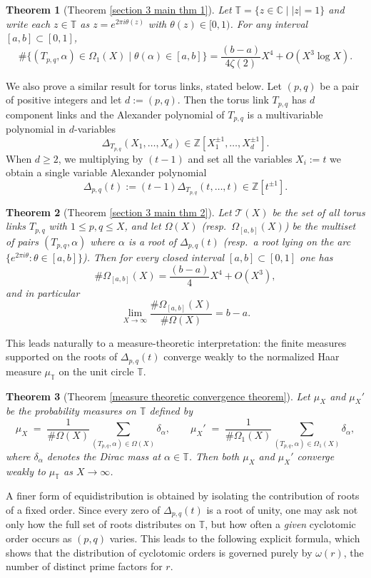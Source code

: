 \documentclass[table]{amsart}
\newtheorem{lthm}{Theorem}
\newcommand{\Z}{\mathbb{Z}}
\numberwithin{equation}{section}
\begin{document}
\begin{lthm}[Theorem \ref{section 3 main thm 1}]
Let $\mathbb{T}=\{z\in\mathbb{C}\mid |z|=1\}$ and write each $z\in\mathbb{T}$ as $z=e^{2\pi i\theta(z)}$ with $\theta(z)\in[0,1)$. For any interval $[a,b]\subset[0,1]$,
\[
\#\{(T_{p,q},\alpha)\in\Omega_1(X)\mid \theta(\alpha)\in[a,b]\}
= \frac{(b-a)}{4\zeta(2)}X^4 + O(X^3\log X).
\]
\end{lthm}
\noindent We also prove a similar result for torus links, stated below. Let $(p,q)$ be a pair of positive integers and let $d:=(p,q)$. Then the torus link $T_{p,q}$ has $d$ component links and the Alexander polynomial of $T_{p,q}$ is a multivariable polynomial in $d$-variables 
\[\Delta_{T_{p,q}}(X_1,\dots, X_d)\in \Z[X_1^{\pm 1}, \dots, X_d^{\pm 1}].\] When $d\geq 2$, we multiplying by $(t-1)$ and set all the variables $X_i:=t$ we obtain a single variable Alexander polynomial
\[\Delta_{p,q}(t):=(t-1)\Delta_{T_{p,q}}(t, \dots, t)\in \Z[t^{\pm 1}].\]
\begin{lthm}[Theorem \ref{section 3 main thm 2}]
Let $\mathcal{T}(X)$ be the set of all torus links $T_{p,q}$ with $1\le p,q\le X$, and let $\Omega(X)$ (resp.\ $\Omega_{[a,b]}(X)$) be the multiset of pairs $(T_{p,q},\alpha)$ where $\alpha$ is a root of $\Delta_{p,q}(t)$ (resp.\ a root lying on the arc $\{e^{2\pi i\theta}:\theta\in[a,b]\}$). Then for every closed interval $[a,b]\subset[0,1]$ one has
\[
\#\Omega_{[a,b]}(X)=\frac{(b-a)}{4}X^{4}+O(X^{3}),
\]
and in particular
\[
\lim_{X\to\infty}\frac{\#\Omega_{[a,b]}(X)}{\#\Omega(X)} = b-a.
\]
\end{lthm}





This leads naturally to a measure-theoretic interpretation: the finite measures supported on the roots of 
$\Delta_{p,q}(t)$ converge weakly to the normalized Haar measure $\mu_{\mathbb{T}}$ on the unit circle $\mathbb{T}$. 

\begin{lthm}[Theorem \ref{measure theoretic convergence theorem}]
Let $\mu_X$ and $\mu_X'$ be the probability measures on $\mathbb{T}$ defined by
\[
\mu_X \;=\; \frac{1}{\#\Omega(X)} \sum_{(T_{p,q},\alpha)\in\Omega(X)} \delta_{\alpha},
\qquad
\mu_X' \;=\; \frac{1}{\#\Omega_1(X)} \sum_{(T_{p,q},\alpha)\in\Omega_1(X)} \delta_{\alpha},
\]
where $\delta_{\alpha}$ denotes the Dirac mass at $\alpha\in\mathbb{T}$. Then both $\mu_X$ and $\mu_X'$ converge \emph{weakly} to $\mu_{\mathbb{T}}$ as $X\to\infty$.
\end{lthm}
A finer form of equidistribution is obtained by isolating the contribution of roots of a fixed order.  
Since every zero of $\Delta_{p,q}(t)$ is a root of unity, one may ask not only how the full set of roots distributes on $\mathbb{T}$, but how often a \emph{given} cyclotomic order occurs as $(p,q)$ varies. This leads to the following explicit formula, which shows that the distribution of cyclotomic orders is governed purely by $\omega(r)$, the number of distinct prime factors for $r$.
\end{document}
